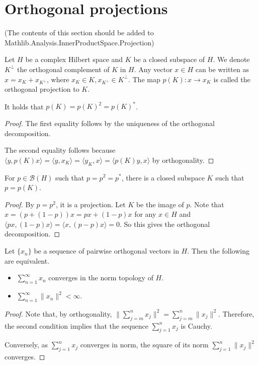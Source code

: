 \chapter{Orthogonal projections}

(The contents of this section should be added to Mathlib.Analysis.InnerProductSpace.Projection)

Let $H$ be a complex Hilbert space and $K$ be a closed subspace of $H$.
We denote $K^\perp$ the orthogonal complement of $K$ in $H$.
Any vector $x \in H$ can be written as $x = x_K + x_{K^\perp}$, where $x_K \in K, x_{K^\perp} \in K^\perp$.
The map $p(K) : x \to x_K$ is called the orthogonal projection to $K$.
\begin{lemma}
 It holds that $p(K) = p(K)^2 = p(K)^*$.
\end{lemma}
\begin{proof}
 The first equality follows by the uniqueness of the orthogonal decomposition.

 The second equality follows because $\langle y, p(K)x \rangle = \langle y, x_K\rangle = \langle y_K, x \rangle = \langle p(K)y, x\rangle$
 by orthogonality.
\end{proof}

\begin{lemma}
 For $p \in \mathcal{B}(H)$ such that $p = p^2 = p^*$,
 there is a closed subspace $K$ such that $p = p(K)$.
\end{lemma}
\begin{proof}
 By $p = p^2$, it is a projection. Let $K$ be the image of $p$.
 Note that $x = (p + (1-p))x = px + (1-p)x$ for any $x \in H$
 and $\langle px, (1-p)x\rangle = \langle x, (p-p)x\rangle = 0$.
 So this gives the orthogonal decomposition.
\end{proof}

\begin{lemma}[12.6, part 1]
 Let $\{x_n\}$ be a sequence of pairwise orthogonal vectors in $H$.
 Then the following are equivalent.
 \begin{itemize}
  \item $\sum_{n=1}^\infty x_n$ converges in the norm topology of $H$.
  \item $\sum_{n=1}^\infty \|x_n\|^2 < \infty$.
 \end{itemize}
\end{lemma}
\begin{proof}
 Note that, by orthogonality,
 $\|\sum_{j=m}^n x_j\|^2 = \sum_{j=m}^n \|x_j\|^2$.
 Therefore, the second condition implies that the sequence $\sum_{j=1}^n x_j$ is Cauchy.

 Conversely, as $\sum_{j=1}^n x_j$ converges in norm, the square of its norm $\sum_{j=1}^n \|x_j\|^2$ converges.

\end{proof}

